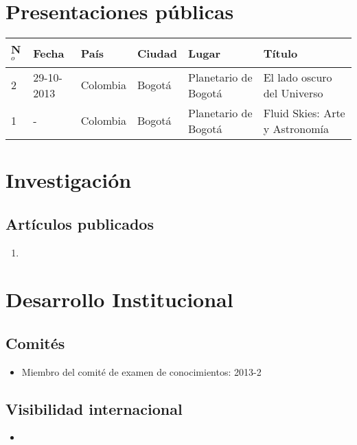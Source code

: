\documentclass{article}
\begin{document}
\section*{Presentaciones p\'ublicas}

\begin{tabular}{lp{2.0cm} p{1.2cm} p{1.5cm} p{2cm} p{5cm}}\hline
N$^{o}$ & Fecha & Pa\'is & Ciudad & Lugar & T\'itulo\\\hline
2 & 29-10-2013 & Colombia & Bogot\'a & Planetario de Bogot\'a & El lado oscuro del Universo\\ \hline
1 & -& Colombia & Bogot\'a & Planetario de Bogot\'a & Fluid Skies: Arte y Astronom\'ia\\ \hline
\end{tabular}

\section*{Investigaci\'on}

\subsection*{Art\'iculos publicados}

\begin{enumerate}
\item 
\end{enumerate}

\section*{Desarrollo Institucional}

\subsection*{Comit\'es}

\begin{itemize}
\item {Miembro del comit\'e de examen de conocimientos}: 2013-2
\end{itemize}

\subsection*{Visibilidad internacional}

\begin{itemize}
\item 
\end{itemize}
\end{document}
